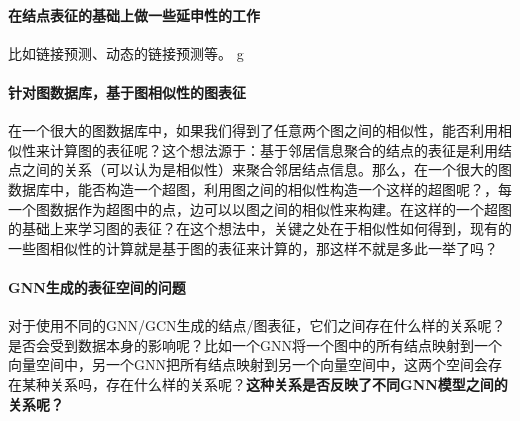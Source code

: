 \paragraph{在结点表征的基础上做一些延申性的工作}比如链接预测、动态的链接预测等。
g
\paragraph{针对图数据库，基于图相似性的图表征}在一个很大的图数据库中，如果我们得到了任意两个图之间的相似性，能否利用相似性来计算图的表征呢？这个想法源于：基于邻居信息聚合的结点的表征是利用结点之间的关系（可以认为是相似性）来聚合邻居结点信息。那么，{\color{red}在一个很大的图数据库中，能否构造一个超图，利用图之间的相似性构造一个这样的超图呢？，每一个图数据作为超图中的点，边可以以图之间的相似性来构建。在这样的一个超图的基础上来学习图的表征？}在这个想法中，关键之处在于相似性如何得到，现有的一些图相似性的计算就是基于图的表征来计算的，那这样不就是多此一举了吗？

\paragraph{GNN生成的表征空间的问题}对于使用不同的GNN/GCN生成的结点/图表征，它们之间存在什么样的关系呢？是否会受到数据本身的影响呢？比如一个GNN将一个图中的所有结点映射到一个向量空间中，另一个GNN把所有结点映射到另一个向量空间中，这两个空间会存在某种关系吗，存在什么样的关系呢？{\textbf{\color{red}这种关系是否反映了不同GNN模型之间的关系呢？}}
